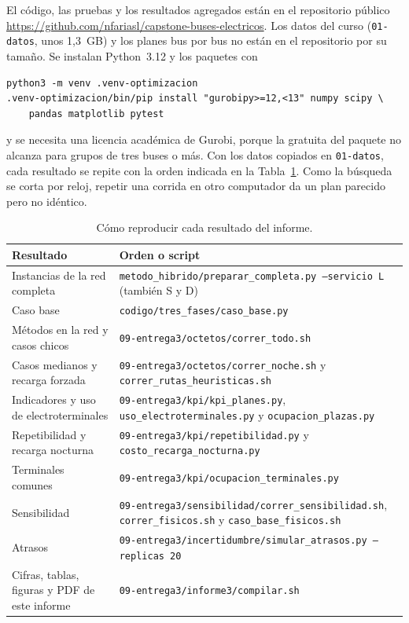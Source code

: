 El código, las pruebas y los resultados agregados están en el repositorio público \url{https://github.com/nfariasl/capstone-buses-electricos}. Los datos del curso (\texttt{01-datos}, unos 1,3~GB) y los planes bus por bus no están en el repositorio por su tamaño. Se instalan Python~3.12 y los paquetes con %
\begin{verbatim}
python3 -m venv .venv-optimizacion
.venv-optimizacion/bin/pip install "gurobipy>=12,<13" numpy scipy \
    pandas matplotlib pytest
\end{verbatim}
y se necesita una licencia académica de Gurobi, porque la gratuita del paquete no alcanza para grupos de tres buses o más. Con los datos copiados en \texttt{01-datos}, cada resultado se repite con la orden indicada en la Tabla~\ref{tab:reproduccion}. Como la búsqueda se corta por reloj, repetir una corrida en otro computador da un plan parecido pero no idéntico.

\begin{table}[H]
\centering
\caption{Cómo reproducir cada resultado del informe.}
\label{tab:reproduccion}
\footnotesize
\begin{tabularx}{\textwidth}{@{}p{3.4cm} X@{}}
\toprule
Resultado & Orden o script \\
\midrule
Instancias de la red completa & \texttt{metodo\_hibrido/preparar\_completa.py --servicio L} (también S y D) \\
Caso base & \texttt{codigo/tres\_fases/caso\_base.py} \\
Métodos en la red y casos chicos & \texttt{09-entrega3/octetos/correr\_todo.sh} \\
Casos medianos y recarga forzada & \texttt{09-entrega3/octetos/correr\_noche.sh} y \texttt{correr\_rutas\_heuristicas.sh} \\
Indicadores y uso de electroterminales & \texttt{09-entrega3/kpi/kpi\_planes.py}, \texttt{uso\_electroterminales.py} y \texttt{ocupacion\_plazas.py} \\
Repetibilidad y recarga nocturna & \texttt{09-entrega3/kpi/repetibilidad.py} y \texttt{costo\_recarga\_nocturna.py} \\
Terminales comunes & \texttt{09-entrega3/kpi/ocupacion\_terminales.py} \\
Sensibilidad & \texttt{09-entrega3/sensibilidad/correr\_sensibilidad.sh}, \texttt{correr\_fisicos.sh} y \texttt{caso\_base\_fisicos.sh} \\
Atrasos & \texttt{09-entrega3/incertidumbre/simular\_atrasos.py --replicas 20} \\
Cifras, tablas, figuras y PDF de este informe & \texttt{09-entrega3/informe3/compilar.sh} \\
\bottomrule
\end{tabularx}
\end{table}
